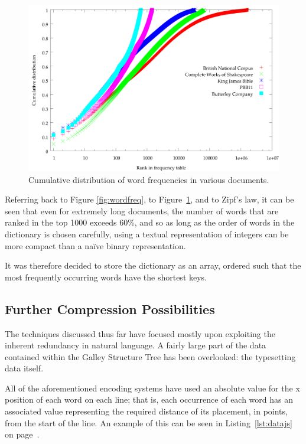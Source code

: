 \begin{figure}
  \begin{center}
  \includegraphics[width=\textwidth]{gnuplot/cumulative-raster}
  \end{center}
  \caption[Cumulative distribution of word frequencies]{Cumulative distribution of word frequencies in various documents. }
  \label{fig:cumulative}
\end{figure}

Referring back to Figure \ref{fig:wordfreq}, to Figure~\ref{fig:cumulative}, and to Zipf's law, it can be seen that even for extremely long documents, the number of words that are ranked in the top 1000 exceeds 60\%, and so as long as the order of words in the dictionary is chosen carefully, using a textual representation of integers can be more compact than a na\"ive binary representation.

It was therefore decided to store the dictionary as an array, ordered such that the most frequently occurring words have the shortest keys.

\subsection{Further Compression Possibilities}
\label{sec:deltas}

The techniques discussed thus far have focused mostly upon exploiting the inherent redundancy in natural language. A fairly large part of the data contained within the Galley Structure Tree has been overlooked: the typesetting data itself.

All of the aforementioned encoding systems have used an absolute value for the x position of each word on each line; that is, each occurrence of each word has an associated value representing the required distance of its placement, in \glspl{point}, from the start of the line. An example of this can be seen in Listing~\ref{lst:datajs} on page~\pageref{lst:datajs}.

